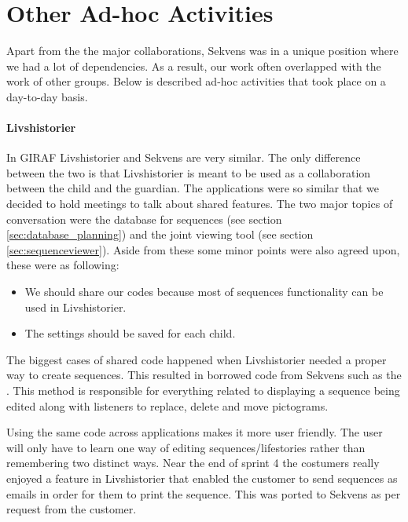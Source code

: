 \section{Other Ad-hoc Activities}\label{sec:adhoc}
Apart from the the major collaborations, Sekvens was in a unique position where we had a lot of dependencies. As a result, our work often overlapped with the work of other groups. Below is described ad-hoc activities that took place on a day-to-day basis.

\paragraph{Livshistorier} 
In GIRAF Livshistorier and Sekvens are very similar. The only difference between the two is that Livshistorier is meant to be used as a collaboration between the child and the guardian. The applications were so similar that we decided to hold meetings to talk about shared features. The two major topics of conversation were the database for sequences (see section \ref{sec:database_planning}) and the joint viewing tool (see section \ref{sec:sequenceviewer}). Aside from these some minor points were also agreed upon, these were as following:

\begin{itemize}
\item We should share our codes because most of sequences functionality can be used in Livshistorier.
\item The settings should be saved for each child.
\end{itemize}

The biggest cases of shared code happened when Livshistorier needed a proper way to create sequences. This resulted in borrowed code from Sekvens such as the . This method is responsible for everything related to displaying a sequence being edited along with listeners to replace, delete and move pictograms.

Using the same code across applications makes it more user friendly. The user will only have to learn one way of editing sequences/lifestories rather than remembering two distinct ways. Near the end of sprint 4 the costumers really enjoyed a feature in Livshistorier that enabled the customer to send sequences as emails in order for them to print the sequence. This was ported to Sekvens as per request from the customer.

